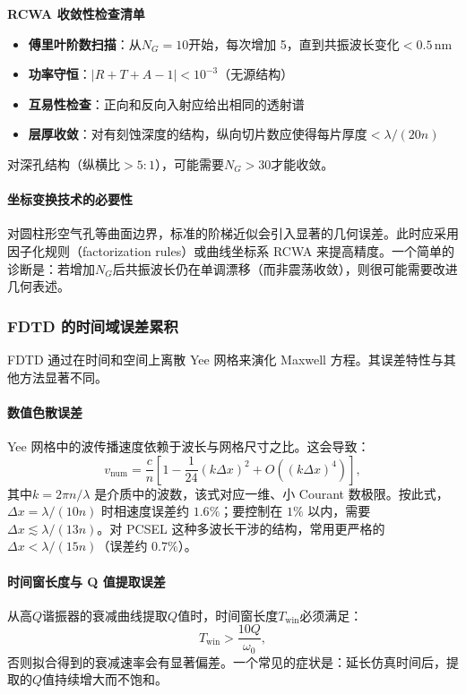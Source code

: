 \begin{NumericalErrorBox}
\textbf{RCWA 收敛性检查清单}
\begin{itemize}
  \item \textbf{傅里叶阶数扫描}：从$N_G=10$开始，每次增加 5，直到共振波长变化$<0.5\,$nm
  \item \textbf{功率守恒}：$|R+T+A-1| < 10^{-3}$（无源结构）
  \item \textbf{互易性检查}：正向和反向入射应给出相同的透射谱
  \item \textbf{层厚收敛}：对有刻蚀深度的结构，纵向切片数应使得每片厚度$<\lambda/(20 n)$
\end{itemize}
对深孔结构（纵横比$>5:1$），可能需要$N_G > 30$才能收敛。
\end{NumericalErrorBox}

\paragraph{坐标变换技术的必要性}
对圆柱形空气孔等曲面边界，标准的阶梯近似会引入显著的几何误差。此时应采用因子化规则（factorization rules）或曲线坐标系 RCWA 来提高精度。一个简单的诊断是：若增加$N_G$后共振波长仍在单调漂移（而非震荡收敛），则很可能需要改进几何表述。

\subsubsection{FDTD 的时间域误差累积}
FDTD 通过在时间和空间上离散 Yee 网格来演化 Maxwell 方程。其误差特性与其他方法显著不同。

\paragraph{数值色散误差}
Yee 网格中的波传播速度依赖于波长与网格尺寸之比。这会导致：
\begin{equation}
v_{\text{num}} = \frac{c}{n}\left[1 - \frac{1}{24}(k\Delta x)^2 + O((k\Delta x)^4)\right],
\label{eq:fdfd_numerical_dispersion}
\end{equation}
其中$k=2\pi n/\lambda$ 是介质中的波数，该式对应一维、小 Courant 数极限。按此式，$\Delta x=\lambda/(10n)$ 时相速度误差约 $1.6\%$；要控制在 $1\%$ 以内，需要 $\Delta x \lesssim \lambda/(13n)$。对 PCSEL 这种多波长干涉的结构，常用更严格的 $\Delta x < \lambda/(15n)$（误差约 $0.7\%$）。

\paragraph{时间窗长度与 Q 值提取误差}
从高$Q$谐振器的衰减曲线提取$Q$值时，时间窗长度$T_{\text{win}}$必须满足：
\begin{equation}
T_{\text{win}} > \frac{10 Q}{\omega_0},
\label{eq:fdfd_time_window_requirement}
\end{equation}
否则拟合得到的衰减速率会有显著偏差。一个常见的症状是：延长仿真时间后，提取的$Q$值持续增大而不饱和。

